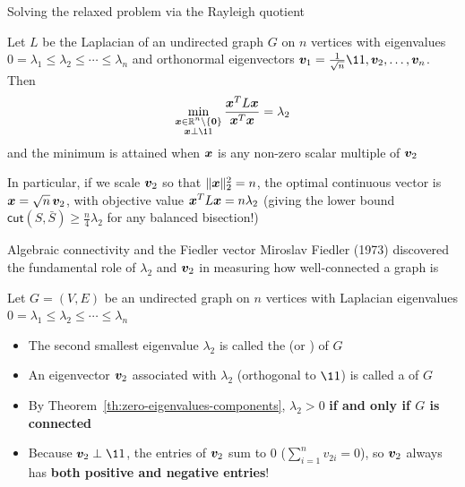 \documentclass[aspectratio=169]{beamer}\usepackage[]{graphicx}\usepackage[]{xcolor}
\begin{document}
\begin{frame}{Solving the relaxed problem via the Rayleigh quotient}
\begin{importanttheorem}
\label{th:rayleigh-fiedler}
Let $L$ be the Laplacian of an undirected graph $G$ on $n$ vertices with eigenvalues $0 = \lambda_1 \le \lambda_2 \le \cdots \le \lambda_n$ and orthonormal eigenvectors $\bv_1 = \frac{1}{\sqrt{n}}\11, \bv_2, \ldots, \bv_n$. Then
\[
\min_{\substack{\bx \in \IR^n \setminus \{\b0\} \\ \bx \perp \11}} \frac{\bx^T L \bx}{\bx^T \bx} = \lambda_2
\]
and the minimum is attained when $\bm{x}$ is any non-zero scalar multiple of $\bm{v}_2$
\end{importanttheorem}
\vfill
In particular, if we scale $\bm{v}_2$ so that $\|\bm{x}\|_2^2 = n$, the optimal continuous vector is $\bm{x} = \sqrt{n}\,\bm{v}_2$, with objective value $\bm{x}^T L \bm{x} = n\lambda_2$ (giving the lower bound $\mathsf{cut}(S, \bar{S}) \ge \frac{n}{4}\lambda_2$ for any balanced bisection!)
\end{frame}


\begin{frame}{Algebraic connectivity and the Fiedler vector}
Miroslav Fiedler (1973) discovered the fundamental role of $\lambda_2$ and $\bm{v}_2$ in measuring how well-connected a graph is
\vfill
\begin{importantdefinition}
Let $G = (V, E)$ be an undirected graph on $n$ vertices with Laplacian eigenvalues $0 = \lambda_1 \le \lambda_2 \le \cdots \le \lambda_n$
\begin{itemize}
\item The second smallest eigenvalue $\lambda_2$ is called the  (or ) of $G$
\item An eigenvector $\bm{v}_2$ associated with $\lambda_2$ (orthogonal to $\11$) is called a  of $G$
\end{itemize}
\end{importantdefinition}
\vfill
\begin{itemize}
\item By Theorem~\ref{th:zero-eigenvalues-components}, $\lambda_2 > 0$ \textbf{if and only if $G$ is connected}
\item Because $\bv_2 \perp \11$, the entries of $\bm{v}_2$ sum to $0$ ($\sum_{i=1}^n v_{2i} = 0$), so $\bm{v}_2$ always has \textbf{both positive and negative entries}!
\end{itemize}
\end{frame}
\end{document}
